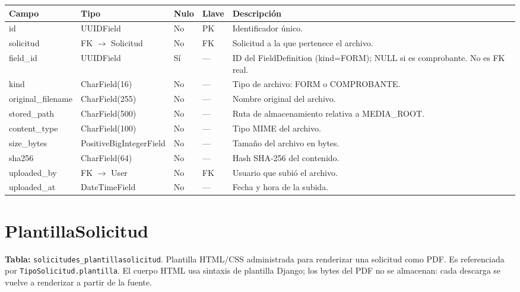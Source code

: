 \documentclass[12pt,letterpaper]{report}
\begin{document}
\begin{longtable}{L{2.9cm} L{2.6cm} C{1.0cm} C{1.0cm} L{6.6cm}}
\toprule
\textbf{Campo} & \textbf{Tipo} & \textbf{Nulo} & \textbf{Llave} & \textbf{Descripción} \\
\midrule
\endhead
id & UUIDField & No & PK & Identificador único. \\
solicitud & FK $\rightarrow$ Solicitud & No & FK & Solicitud a la que pertenece el archivo. \\
field\_id & UUIDField & Sí & --- & ID del FieldDefinition (kind=FORM); NULL si es comprobante. No es FK real. \\
kind & CharField(16) & No & --- & Tipo de archivo: FORM o COMPROBANTE. \\
original\_filename & CharField(255) & No & --- & Nombre original del archivo. \\
stored\_path & CharField(500) & No & --- & Ruta de almacenamiento relativa a MEDIA\_ROOT. \\
content\_type & CharField(100) & No & --- & Tipo MIME del archivo. \\
size\_bytes & PositiveBigIntegerField & No & --- & Tamaño del archivo en bytes. \\
sha256 & CharField(64) & No & --- & Hash SHA-256 del contenido. \\
uploaded\_by & FK $\rightarrow$ User & No & FK & Usuario que subió el archivo. \\
uploaded\_at & DateTimeField & No & --- & Fecha y hora de la subida. \\
\bottomrule
\end{longtable}

\section{PlantillaSolicitud}

\textbf{Tabla:} \texttt{solicitudes\_plantillasolicitud}. Plantilla HTML/CSS
administrada para renderizar una solicitud como PDF. Es referenciada por
\texttt{TipoSolicitud.plantilla}. El cuerpo HTML usa sintaxis de plantilla
Django; los bytes del PDF no se almacenan: cada descarga se vuelve a renderizar
a partir de la fuente.
\end{document}

